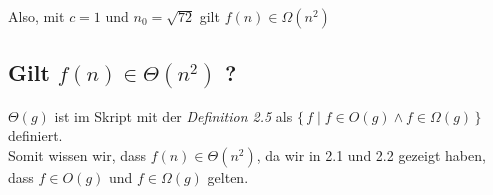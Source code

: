 \documentclass{article}
\begin{document}
Also, mit $c = 1$ und $n_0 = \sqrt{72}$ gilt $f(n) \in \Omega(n^2)$

\subsection{Gilt $f(n) \in \Theta(n^2)$ ?}

$\Theta(g)$ ist im Skript mit der \emph{Definition 2.5} als $\{ \, f \mid f \in O(g) \wedge f \in \Omega(g) \, \}$ definiert.\\[0.5em]
Somit wissen wir, dass $f(n) \in \Theta(n^2)$, da wir in 2.1 und 2.2 gezeigt haben, dass $f \in O(g)$ und $f \in \Omega(g)$ gelten.
\end{document}
